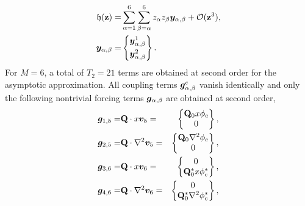 \begin{align}
	\label{eqn:GL_asymptotic}
		\mathfrak{h}(\mathbf{z}) =& \sum_{\alpha=1}^{6}\sum_{\beta=\alpha}^{6} z_{\alpha}z_{\beta}\vfield{y}_{\alpha,\beta}
		 + \mathcal{O}(\mathbf{z}^{3}), \nonumber \\
		 \vfield{y}_{\alpha,\beta} =& \begin{Bmatrix}
		 	\vfield{y}^{1}_{\alpha,\beta} \vspace{1mm} \\
		 	\vfield{y}^{2}_{\alpha,\beta}
		 \end{Bmatrix}.	\nonumber
\end{align}
For $M=6$, a total of $T_{2}=21$ terms are obtained at second order for the asymptotic approximation. All coupling terms $\boldsymbol{g}^{c}_{\alpha,\beta}$ vanish identically and only the following nontrivial forcing terms $\boldsymbol{g}_{\alpha,\beta}$ are obtained at second order,
\begin{align}
	\boldsymbol{g}_{1,5} =& 	\mathbf{Q}\cdot x\boldsymbol{v}_{5} =&
	\begin{Bmatrix}
		\mathbf{Q}_{0}x\phi_{c} \\
		0
	\end{Bmatrix}, \nonumber \\
	\boldsymbol{g}_{2,5} =& 	\mathbf{Q}\cdot \nabla^{2}\boldsymbol{v}_{5} =&
	\begin{Bmatrix}
		\mathbf{Q}_{0}\nabla^{2}\phi_{c}	\\
		0
	\end{Bmatrix}, \nonumber \\
	\boldsymbol{g}_{3,6} =& 	\mathbf{Q}\cdot x\boldsymbol{v}_{6} =&
	\begin{Bmatrix}
		0	\\
		\mathbf{Q}^{*}_{0}x\phi^{*}_{c}
	\end{Bmatrix}, \nonumber \\
	\boldsymbol{g}_{4,6} =& 	\mathbf{Q}\cdot \nabla^{2}\boldsymbol{v}_{6} =&
	\begin{Bmatrix}
		0	\\
		\mathbf{Q}^{*}_{0}\nabla^{2}\phi^{*}_{c}
	\end{Bmatrix}, \nonumber
\end{align}
